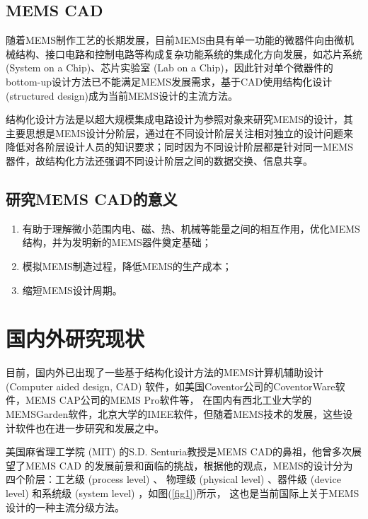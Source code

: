 \documentclass[no-math]{YangThesis}
\begin{document}
\subsection{MEMS CAD}
随着MEMS制作工艺的长期发展，目前MEMS由具有单一功能的微器件向由微机械结构、接口电路和控制电路等构成复杂功能系统的集成化方向发展，如芯片系统 (System on a Chip)、芯片实验室 (Lab on a Chip)，因此针对单个微器件的bottom-up设计方法\cite{bibc15}已不能满足MEMS发展需求，基于CAD使用结构化设计 (structured design)\cite{bibc16}成为当前MEMS设计的主流方法。

结构化设计方法是以超大规模集成电路设计为参照对象来研究MEMS的设计，其主要思想是MEMS设计分阶层，通过在不同设计阶层关注相对独立的设计问题来降低对各阶层设计人员的知识要求；同时因为不同设计阶层都是针对同一MEMS 器件，故结构化方法还强调不同设计阶层之间的数据交换、信息共享。

\subsection{研究MEMS CAD的意义}
\begin{enumerate}[fullwidth, label=(\arabic*), itemindent=2em]
\item  有助于理解微小范围内电、磁、热、机械等能量之间的相互作用，优化MEMS结构，并为发明新的MEMS器件奠定基础\cite{bibc17}；

\item 模拟MEMS制造过程，降低MEMS的生产成本；

\item 缩短MEMS设计周期。
\end{enumerate}

\newpage
\section{国内外研究现状}

目前，国内外已出现了一些基于结构化设计方法的MEMS计算机辅助设计(Computer aided design, CAD) 软件，如美国Coventor公司的CoventorWare\cite{bibc18}软件，MEMS CAP公司的MEMS Pro软件\cite{bibc19}等， 在国内有西北工业大学的MEMSGarden\cite{bibc20}软件，北京大学的IMEE\cite{bibc21}软件，但随着MEMS技术的发展，这些设计软件也在进一步研究和发展之中。

美国麻省理工学院 (MIT) 的S.D. Senturia\cite{bibc22}教授是MEMS CAD的鼻祖，他曾多次展望了MEMS CAD 的发展前景和面临的挑战，根据他的观点，MEMS的设计分为四个阶层\cite{bibc23}：工艺级 (process level) 、 物理级 (physical level) 、器件级 (device level) 和系统级 (system level) ，如图(\ref{fig1})所示， 这也是当前国际上关于MEMS设计的一种主流分级方法。
\end{document}
